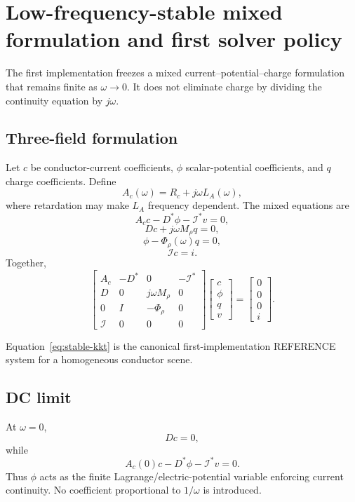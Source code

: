 \section{Low-frequency-stable mixed formulation and first solver policy}
\label{sec:stable-mixed}

The first implementation freezes a mixed current--potential--charge formulation
that remains finite as $\omega\to0$. It does not eliminate charge by dividing
the continuity equation by $j\omega$.

\subsection{Three-field formulation}

Let $c$ be conductor-current coefficients, $\phi$ scalar-potential
coefficients, and $q$ charge coefficients. Define
\[
  A_c(\omega)=R_c+j\omega L_A(\omega),
\]
where retardation may make $L_A$ frequency dependent. The mixed equations are
\[
  A_c c-D^\ast\phi-\mathcal I^\ast v=0,
  \label{eq:mixed-current}
\]
\[
  Dc+j\omega M_\rho q=0,
  \label{eq:mixed-continuity}
\]
\[
  \phi-\Phi_\rho(\omega)q=0,
  \label{eq:mixed-potential}
\]
\[
  \mathcal I c=i.
  \label{eq:mixed-port}
\]
Together,
\[
 \begin{bmatrix}
  A_c & -D^\ast & 0 & -\mathcal I^\ast\\
  D   & 0        & j\omega M_\rho & 0\\
  0   & I        & -\Phi_\rho & 0\\
  \mathcal I & 0 & 0 & 0
 \end{bmatrix}
 \begin{bmatrix}
  c\\\phi\\q\\v
 \end{bmatrix}
 =
 \begin{bmatrix}
  0\\0\\0\\i
 \end{bmatrix}.
 \label{eq:stable-kkt}
\]

Equation~\eqref{eq:stable-kkt} is the canonical first-implementation
REFERENCE system for a homogeneous conductor scene.

\subsection{DC limit}

At $\omega=0$,
\[
  Dc=0,
\]
while
\[
  A_c(0)c-D^\ast\phi-\mathcal I^\ast v=0.
\]
Thus $\phi$ acts as the finite Lagrange/electric-potential variable enforcing
current continuity. No coefficient proportional to $1/\omega$ is introduced.

